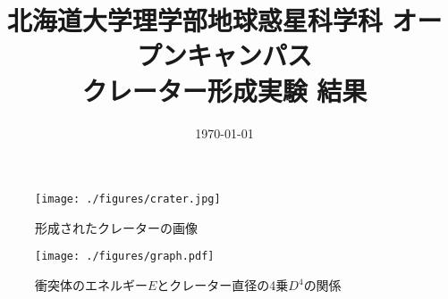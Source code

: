 \documentclass[a4paper]{ltjsarticle}
\begin{document}
\title{北海道大学理学部地球惑星科学科 オープンキャンパス\\クレーター形成実験 結果}
\date{\today}
\maketitle
\thispagestyle{empty}
\begin{figure}[H]
    \centering
    \texttt{[image: ./figures/crater.jpg]}
    \caption{形成されたクレーターの画像}
\end{figure}
\begin{figure}[H]
    \centering
    \texttt{[image: ./figures/graph.pdf]}
    \caption{衝突体のエネルギー$E$とクレーター直径の4乗$D^4$の関係}
\end{figure}
\end{document}
